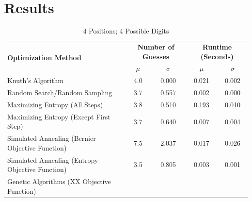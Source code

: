 \documentclass[11pt]{article}
\begin{document}
\newpage
\section{Results}

\begin{table}[h!]
\begin{center}
\begin{tabular}{l c c c c}
\toprule
\multirow{2}{*}{\bfseries Optimization Method} 		& \multicolumn{2}{c}{\bfseries Number of Guesses} 		& \multicolumn{2}{c}{\bfseries Runtime (Seconds)}	\\
\cmidrule(lr){2-3}  \cmidrule(lr){4-5}				& $\mu$ & $\sigma$								& $\mu$ & $\sigma$							\\
\cmidrule(lr){1-5}
Knuth's Algorithm							& 4.0 & 0.000									& 0.021 & 0.002							\\
Random Search/Random Sampling				& 3.7 & 0.557									& 0.002 & 0.000							\\
Maximizing Entropy (All Steps)					& 3.8 & 0.510									& 0.193 & 0.010							\\
Maximizing Entropy (Except First Step)			& 3.7 & 0.640									& 0.007 & 0.004							\\
Simulated Annealing (Bernier Objective Function)	& 7.5 & 2.037									& 0.017 & 0.026							\\
Simulated Annealing (Entropy Objective Function)	& 3.5 & 0.805									& 0.003 & 0.001							\\
Genetic Algorithms (XX Objective Function)		& &											& &										\\
\bottomrule
\end{tabular}
\end{center}
\caption{4 Positions; 4 Possible Digits}
\label{fig:compare_4_4}
\end{table}
\end{document}
